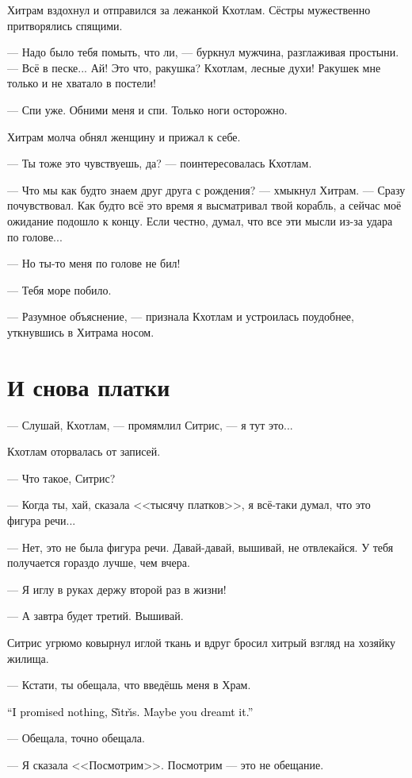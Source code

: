 \documentclass[a4paper,10pt,fleqn]{book}\usepackage{cooltooltips}\usepackage{polyglossia}\setdefaultlanguage{english}\setotherlanguage{russian}\defaultfontfeatures{Ligatures=TeX,Mapping=tex-text} \usepackage{xcolor}\definecolor{lightgray}{HTML}{bbbbbb}\color{lightgray}\newcommand{\ml}[3]{\textcolor{black}{#3}}
\newcommand{\Sitris}{S\~{\i}tr\v{\i}s}
\begin{document}
Хитрам вздохнул и отправился за лежанкой Кхотлам.
Сёстры мужественно притворялись спящими.

--- Надо было тебя помыть, что ли, --- буркнул мужчина, разглаживая простыни.
--- Всё в песке...
Ай!
Это что, ракушка?
Кхотлам, лесные духи!
Ракушек мне только и не хватало в постели!

--- Спи уже.
Обними меня и спи.
Только ноги осторожно.

Хитрам молча обнял женщину и прижал к себе.

--- Ты тоже это чувствуешь, да? --- поинтересовалась Кхотлам.

--- Что мы как будто знаем друг друга с рождения? --- хмыкнул Хитрам.
--- Сразу почувствовал.
Как будто всё это время я высматривал твой корабль, а сейчас моё ожидание подошло к концу.
Если честно, думал, что все эти мысли из-за удара по голове...

--- Но ты-то меня по голове не бил!

--- Тебя море побило.

--- Разумное объяснение, --- признала Кхотлам и устроилась поудобнее, уткнувшись в Хитрама носом.

\section{И снова платки}

--- Слушай, Кхотлам, --- промямлил Ситрис, --- я тут это...

Кхотлам оторвалась от записей.

--- Что такое, Ситрис?

--- Когда ты, хай, сказала <<тысячу платков>>, я всё-таки думал, что это фигура речи...

--- Нет, это не была фигура речи.
Давай-давай, вышивай, не отвлекайся.
У тебя получается гораздо лучше, чем вчера.

--- Я иглу в руках держу второй раз в жизни!

--- А завтра будет третий.
Вышивай.

Ситрис угрюмо ковырнул иглой ткань и вдруг бросил хитрый взгляд на хозяйку жилища.

--- Кстати, ты обещала, что введёшь меня в Храм.

\ml{$0$}
{--- Я тебе ничего не обещала, Ситрис.}
{``I promised nothing, \Sitris.}
\ml{$0$}
{Тебе, наверное, приснилось.}
{Maybe you dreamt it.''}

--- Обещала, точно обещала.

--- Я сказала <<Посмотрим>>.
Посмотрим --- это не обещание.
\end{document}
